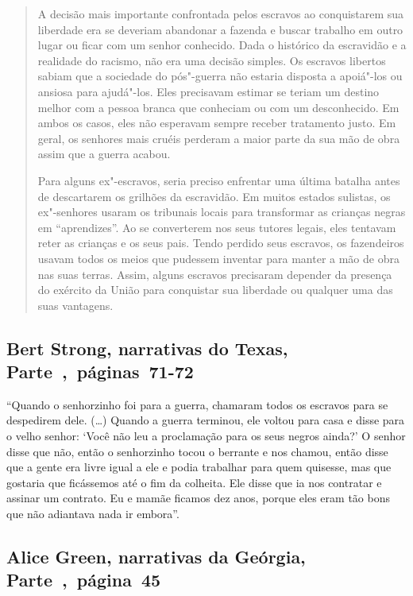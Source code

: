 \begin{quote}
A decisão mais importante confrontada pelos escravos ao
conquistarem sua liberdade era se deveriam abandonar a fazenda e buscar
trabalho em outro lugar ou ficar com um senhor conhecido. Dada o
histórico da escravidão e a realidade do racismo, não era uma decisão
simples. Os escravos libertos sabiam que a sociedade do pós"-guerra não
estaria disposta a apoiá"-los ou ansiosa para ajudá"-los. Eles precisavam
estimar se teriam um destino melhor com a pessoa branca que conheciam ou
com um desconhecido. Em ambos os casos, eles não esperavam sempre
receber tratamento justo. Em geral, os senhores mais cruéis perderam a
maior parte da sua mão de obra assim que a guerra acabou.

Para alguns ex"-escravos, seria preciso enfrentar uma última
batalha antes de descartarem os grilhões da escravidão. Em muitos
estados sulistas, os ex"-senhores usaram os tribunais locais para
transformar as crianças negras em ``aprendizes''. Ao se converterem nos
seus tutores legais, eles tentavam reter as crianças e os seus pais.
Tendo perdido seus escravos, os fazendeiros usavam todos os meios que
pudessem inventar para manter a mão de obra nas suas terras. Assim,
alguns escravos precisaram depender da presença do exército da União
para conquistar sua liberdade ou qualquer uma das suas vantagens.
\end{quote}

\subsection{Bert Strong, narrativas do Texas, Parte~,~páginas~71-72}
\label{ref259}

``Quando o senhorzinho foi para a guerra, chamaram todos os escravos
para se despedirem dele. (\ldots{}) Quando a guerra terminou, ele voltou
para casa e disse para o velho senhor: `Você não leu a proclamação para
os seus negros ainda?' O senhor disse que não, então o senhorzinho tocou
o berrante e nos chamou, então disse que a gente era livre igual a ele e
podia trabalhar para quem quisesse, mas que gostaria que ficássemos até
o fim da colheita. Ele disse que ia nos contratar e assinar um contrato.
Eu e mamãe ficamos dez anos, porque eles eram tão bons que não adiantava
nada ir embora''.

\subsection{Alice Green, narrativas da Geórgia, Parte~,~página~45}
\label{ref110}

